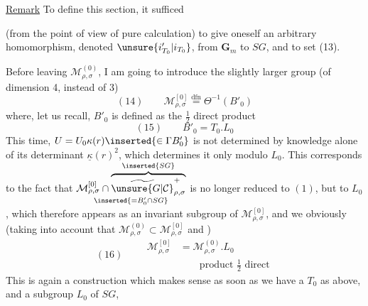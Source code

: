\uline{Remark}\quad{}
To define this section, it sufficed



(from the point of view of pure calculation) to give oneself an arbitrary homomorphism, denoted
$\unsure{i'_{T_0}|i_{T_0}}$, from $\mathbf G_m$ to $SG$, and to set (13).

Before leaving $\mathcal M_{\rho,\sigma}^{(0)}$, I am going to introduce the
slightly larger group (of dimension 4, instead of 3)
\[
(14)\qquad\mathcal M_{\rho,\sigma}^{[0]}
\overset{\mathrm{dfn}}{=}\Theta^{-1}(B'_0)
\]
where, let us recall, $B'_0$ is defined as the $\frac12$ direct product
\[
(15)\qquad B'_0=T_0.L_0
\]
This time, $U=U_0\kappa(r)\inserted{\in\Gamma B'_0}$ is not determined
by knowledge alone of its determinant
$\underline\kappa(r)^2$, which determines it only modulo $L_0$.
This corresponds to the fact that
$\underset{\inserted{=B'_0\cap SG}}{
\mathcal M_{\rho,\sigma}^{[0]}\cap
\overbrace{\widetilde{\unsure{G|\mathcal C}}_{\rho,\sigma}^{+}}^{\inserted{SG}}}$
is no longer reduced to $(1)$, but to $L_0$, which therefore appears as
an invariant subgroup of $\mathcal M_{\rho,\sigma}^{[0]}$, and we obviously 
(taking into account that $\mathcal M_{\rho,\sigma}^{(0)}\subset\mathcal M_{\rho,\sigma}^{[0]}$ and
) 
\[
(16)\qquad\begin{aligned}
\mathcal M_{\rho,\sigma}^{[0]}&=\mathcal M_{\rho,\sigma}^{(0)}.L_0\\
&\qquad\text{product }\frac12\text{ direct}
\end{aligned}
\]
This is again a construction which makes sense as soon as we have a $T_0$ as above,
 and a subgroup  $L_0$ of $SG$,

